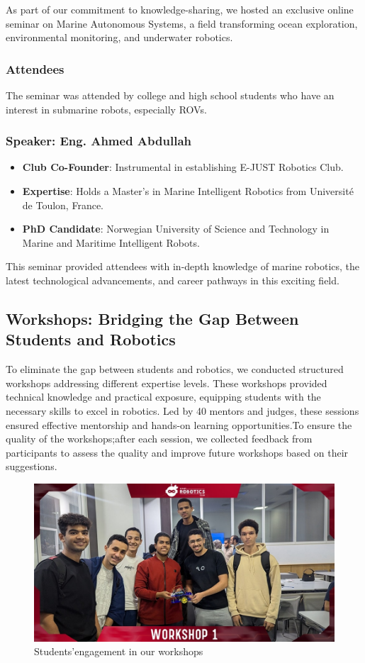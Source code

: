 \documentclass[11pt, twocolumn]{article}
\begin{document}
\noindent As part of our commitment to knowledge-sharing, we hosted an exclusive online seminar on Marine Autonomous Systems, a field transforming ocean exploration, environmental monitoring, and underwater robotics.
\subsubsection{Attendees}
The seminar was attended by college and high school students who have an interest in submarine robots, especially ROVs.

\subsubsection{Speaker: Eng. Ahmed Abdullah}
\begin{itemize}
    \item \textbf{Club Co-Founder}: Instrumental in establishing E-JUST Robotics Club.
    \item \textbf{Expertise}: Holds a Master’s in Marine Intelligent Robotics from Université de Toulon, France.
    \item \textbf{PhD Candidate}: Norwegian University of Science and Technology in Marine and Maritime Intelligent Robots.

    


\end{itemize}

This seminar provided attendees with in-depth knowledge of marine robotics, the latest technological advancements, and career pathways in this exciting field.

\subsection{Workshops: Bridging the Gap Between Students and Robotics}
To eliminate the gap between students and robotics, we conducted structured workshops addressing different expertise levels. These workshops provided technical knowledge and practical exposure, equipping students with the necessary skills to excel in robotics. Led by 40 mentors and judges, these sessions ensured effective mentorship and hands-on learning opportunities.To ensure the quality of the workshops;after each session, we collected feedback from participants to assess the quality and improve future workshops based on their suggestions.
\begin{figure}[h]
            \centering
            \includegraphics[width=0.7\linewidth]{Images/workshop oo.jpg}
           \caption{Students'engagement in our workshops}
            \label{fig:engagement}
                \end{figure}
\end{document}
